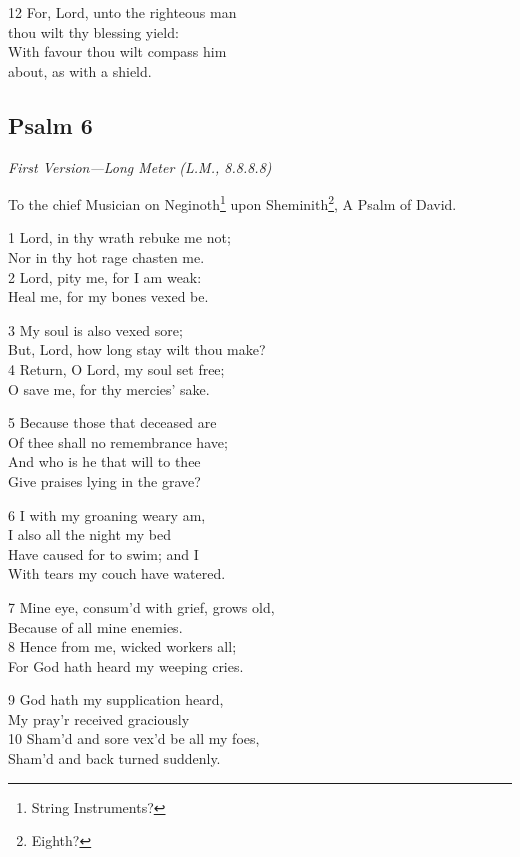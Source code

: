 12 For, Lord, unto the righteous man\\
thou wilt thy blessing yield:\\
With favour thou wilt compass him \\
about, as with a shield.

\begin{center}
\quad{}\quad{}
\end{center}

\subsection*{Psalm 6}

\emph{First Version---Long Meter (L.M., 8.8.8.8)} 

To the chief Musician on Neginoth\footnote{String Instruments?} upon Sheminith\footnote{Eighth?},
A Psalm of David.

1 Lord, in thy wrath rebuke me not;\\
Nor in thy hot rage chasten me.\\
2 Lord, pity me, for I am weak:\\
Heal me, for my bones vexed be.

3 My soul is also vexed sore;\\
But, Lord, how long stay wilt thou make?\\
4 Return, O Lord, my soul set free;\\
O save me, for thy mercies’ sake.

5 Because those that deceased are\\
Of thee shall no remembrance have;\\
And who is he that will to thee\\
Give praises lying in the grave?

6 I with my groaning weary am,\\
I also all the night my bed\\
Have caused for to swim; and I\\
With tears my couch have watered.

7 Mine eye, consum’d with grief, grows old,\\
Because of all mine enemies.\\
8 Hence from me, wicked workers all;\\
For God hath heard my weeping cries.

9 God hath my supplication heard,\\
My pray’r received graciously\\
10 Sham’d and sore vex’d be all my foes,\\
Sham’d and back turned suddenly.

